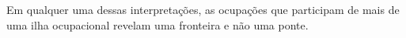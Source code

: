 \documentclass[
  article,
  11pt,
  a4paper,
  english,
  brazil,
  sumario=tradicional]{abntex2}
\begin{document}
Em qualquer uma dessas interpretações, as ocupações que participam de mais de uma ilha ocupacional revelam uma fronteira e não uma ponte.

\end{document}
